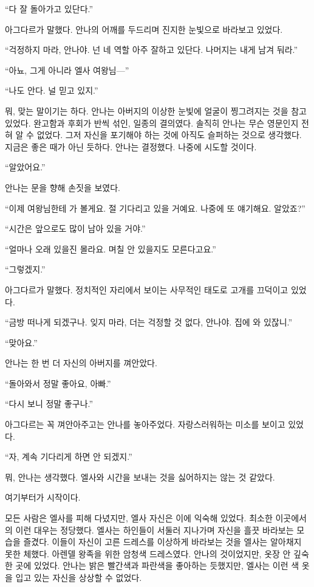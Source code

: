 ``다 잘 돌아가고 있단다.''

아그다르가 말했다. 안나의 어깨를 두드리며 진지한 눈빛으로 바라보고 있었다.

``걱정하지 마라, 안나야. 넌 네 역할 아주 잘하고 있단다. 나머지는 내게 남겨 둬라.''

``아뇨, 그게 아니라 엘사 여왕님—''

``나도 안다. 널 믿고 있지.''

뭐, 맞는 말이기는 하다. 안나는 아버지의 이상한 눈빛에 얼굴이 찡그려지는 것을 참고 있었다. 완고함과 후회가 반씩 섞인, 일종의 결의였다. 솔직히 안나는 무슨 영문인지 전혀 알 수 없었다. 그저 자신을 포기해야 하는 것에 아직도 슬퍼하는 것으로 생각했다. 지금은 좋은 때가 아닌 듯하다. 안나는 결정했다. 나중에 시도할 것이다.

``알았어요.''

안나는 문을 향해 손짓을 보였다.

``이제 여왕님한테 가 볼게요. 절 기다리고 있을 거예요. 나중에 또 얘기해요. 알았죠?''

``시간은 앞으로도 많이 남아 있을 거야.''

``얼마나 오래 있을진 몰라요. 며칠 안 있을지도 모른다고요.''

``그렇겠지.''

아그다르가 말했다. 정치적인 자리에서 보이는 사무적인 태도로 고개를 끄덕이고 있었다.

``금방 떠나게 되겠구나. 잊지 마라, 더는 걱정할 것 없다, 안나야. 집에 와 있잖니.''

``맞아요.''

안나는 한 번 더 자신의 아버지를 껴안았다.

``돌아와서 정말 좋아요, 아빠.''

``다시 보니 정말 좋구나.''

아그다르는 꼭 껴안아주고는 안나를 놓아주었다. 자랑스러워하는 미소를 보이고 있었다.

``자, 계속 기다리게 하면 안 되겠지.''

뭐, 안나는 생각했다. 엘사와 시간을 보내는 것을 싫어하지는 않는 것 같았다.

여기부터가 시작이다.

\textbreak

모든 사람은 엘사를 피해 다녔지만, 엘사 자신은 이에 익숙해 있었다. 최소한 이곳에서의 이런 대우는 정당했다. 엘사는 하인들이 서둘러 지나가며 자신을 흘끗 바라보는 모습을 즐겼다. 이들이 자신이 고른 드레스를 이상하게 바라보는 것을 엘사는 알아채지 못한 체했다. 아렌델 왕족을 위한 암청색 드레스였다. 안나의 것이었지만, 옷장 안 깊숙한 곳에 있었다. 안나는 밝은 빨간색과 파란색을 좋아하는 듯했지만, 엘사는 이런 색 옷을 입고 있는 자신을 상상할 수 없었다.

